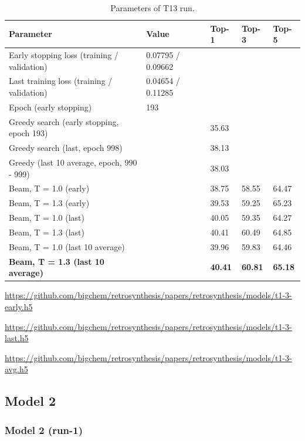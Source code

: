 \documentclass{article}
\begin{document}
\begin{table}[h!]
\caption{Parameters of T13 run.}
  \centering
  \begin{tabular}{p{6.2cm}p{3.5cm}p{1.5cm}p{1.5cm}p{1.5cm}}
    \toprule
    Parameter & Value & Top-1 & Top-3 & Top-5 \\
    \midrule
    Early stopping loss (training / validation) &  0.07795 / 0.09662 & & & \\
    Last training loss (training / validation) &  0.04654 / 0.11285  & & & \\
    Epoch (early stopping) & 193 & & & \\
    \midrule
    Greedy search (early stopping, epoch 193) &  & 35.63 & &\\
    Greedy search (last, epoch 998) &  & 38.13 & & \\
    Greedy (last 10 average, epoch, 990 - 999) & & 38.03 & & \\
    \midrule
    Beam, T = 1.0 (early) & & 38.75 & 58.55 &  64.47 \\
    Beam, T = 1.3 (early) & & 39.53 & 59.25 & 65.23 \\ 
    \midrule
    Beam, T = 1.0 (last) & & 40.05 & 59.35 &  64.27 \\
    Beam, T = 1.3 (last) & & 40.41 & 60.49 &  64.85 \\ 
    \midrule
    Beam, T = 1.0 (last 10 average) & & 39.96 & 59.83 & 64.46  \\
    \textbf{Beam, T = 1.3 (last 10 average)} & & \textbf{40.41}  & \textbf{60.81} & \textbf{65.18}  \\ 
    \bottomrule
  \end{tabular}
  \label{tbl:t13}

\end{table} 

\url{https://github.com/bigchem/retrosynthesis/papers/retrosynthesis/models/t1-3-early.h5}

\url{https://github.com/bigchem/retrosynthesis/papers/retrosynthesis/models/t1-3-last.h5}

\url{https://github.com/bigchem/retrosynthesis/papers/retrosynthesis/models/t1-3-avg.h5}

\newpage
\subsection{Model 2}
\subsubsection{Model 2 (run-1)}
 
\end{document}
